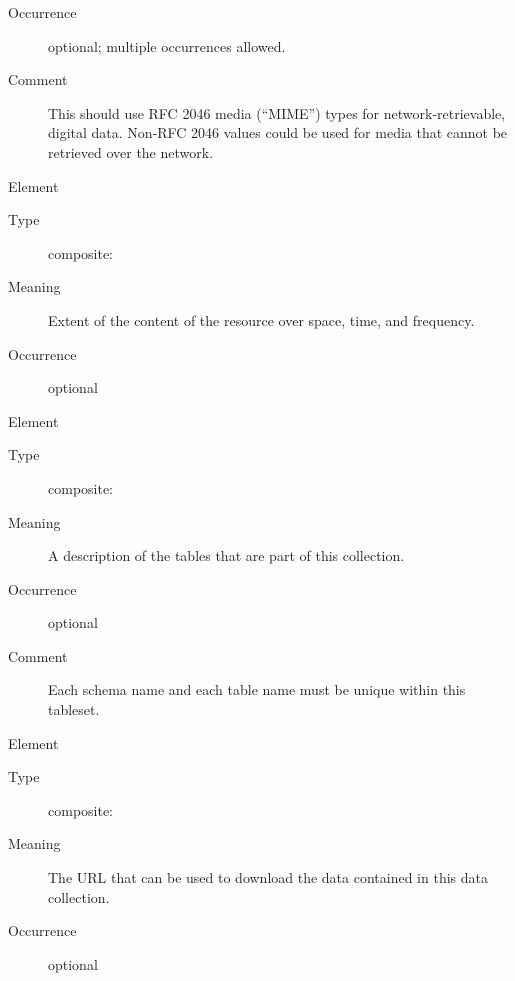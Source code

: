 \documentclass[11pt,a4paper]{ivoa}
\begin{document}
\begin{generated}
\begin{bigdescription}
\begin{description}
\item[Occurrence] optional; multiple occurrences allowed.
\item[Comment] 
                      This should use RFC 2046 media (“MIME”) types for 
                      network-retrievable, digital data.  
                      Non-RFC 2046 values could be used for media that cannot
                      be retrieved over the network.
                    

\end{description}
\item[Element \xmlel{coverage}]
\begin{description}
\item[Type] composite: 
\item[Meaning] 
                     Extent of the content of the resource over space, time, 
                     and frequency.
                   
\item[Occurrence] optional

\end{description}
\item[Element \xmlel{tableset}]
\begin{description}
\item[Type] composite: 
\item[Meaning] 
                     A description of the tables that are part of this
                     collection. 
                   
\item[Occurrence] optional
\item[Comment] 
                     Each schema name and each table name must be
                     unique within this tableset.
                   

\end{description}
\item[Element \xmlel{accessURL}]
\begin{description}
\item[Type] composite: 
\item[Meaning] 
                     The URL that can be used to download the data contained in 
                     this data collection.
                   
\item[Occurrence] optional

\end{description}


\end{bigdescription}\endgroup

\endgroup
\end{generated}
\end{document}
